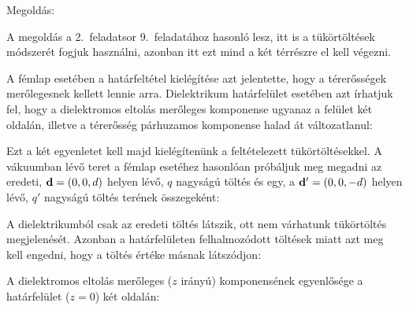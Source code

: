 
\ifdefined\megoldas

 Megoldás: 
 
 A megoldás a 2.~feladatsor 9.~feladatához hasonló lesz, itt is a tükörtöltések módszerét fogjuk használni, azonban itt ezt mind a két térrészre el kell végezni. 
 
 A fémlap esetében a határfeltétel kielégítése azt jelentette, hogy a térerősségek merőlegesnek kellett lennie arra. Dielektrikum határfelület esetében azt írhatjuk fel, hogy a dielektromos eltolás merőleges komponense ugyanaz a felület két oldalán, illetve a térerősség párhuzamos komponense halad át változatlanul:
 
 Ezt a két egyenletet kell majd kielégítenünk a feltételezett tükörtöltésekkel. A vákuumban lévő teret a fémlap esetéhez hasonlóan próbáljuk meg megadni az eredeti, $\mathbf{d}=(0,0,d)$ helyen lévő, $q$ nagyságú töltés és egy, a $\mathbf{d}'=(0,0,-d)$ helyen lévő, $q'$ nagyságú töltés terének összegeként:

 A dielektrikumból csak az eredeti töltés látszik, ott nem várhatunk tükörtöltés megjelenését. Azonban a határfelületen felhalmozódott töltések miatt azt meg kell engedni, hogy a töltés értéke másnak látszódjon:
 
 A dielektromos eltolás merőleges ($z$ irányú) komponensének egyenlősége a határfelület ($z=0$) két oldalán:
 
